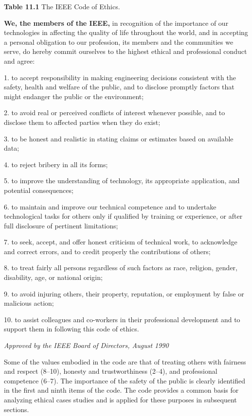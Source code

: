 \textbf{Table 11.1} The IEEE Code of Ethics.

\textbf{We, the members of the IEEE,} in recognition of the importance
of our technologies in affecting the quality of life throughout the
world, and in accepting a personal obligation to our profession, its
members and the communities we serve, do hereby commit ourselves to the
highest ethical and professional conduct and agree:

1. to accept responsibility in making engineering decisions consistent
with the safety, health and welfare of the public, and to disclose
promptly factors that might endanger the public or the environment;

2. to avoid real or perceived conflicts of interest whenever possible,
and to disclose them to affected parties when they do exist;

3. to be honest and realistic in stating claims or estimates based on
available data;

4. to reject bribery in all its forms;

5. to improve the understanding of technology, its appropriate
application, and potential consequences;

6. to maintain and improve our technical competence and to undertake
technological tasks for others only if qualified by training or
experience, or after full disclosure of pertinent limitations;

7. to seek, accept, and offer honest criticism of technical work, to
acknowledge and correct errors, and to credit properly the contributions
of others;

8. to treat fairly all persons regardless of such factors as race,
religion, gender, disability, age, or national origin;

9. to avoid injuring others, their property, reputation, or employment
by false or malicious action;

10. to assist colleagues and co-workers in their professional
development and to support them in following this code of ethics.

\emph{Approved by the IEEE Board of Directors, August 1990}

Some of the values embodied in the code are that of treating others with
fairness and respect (8--10), honesty and trustworthiness (2--4), and
professional competence (6--7). The importance of the safety of the
public is clearly identified in the first and ninth items of the code.
The code provides a common basis for analyzing ethical cases studies and
is applied for these purposes in subsequent sections.

